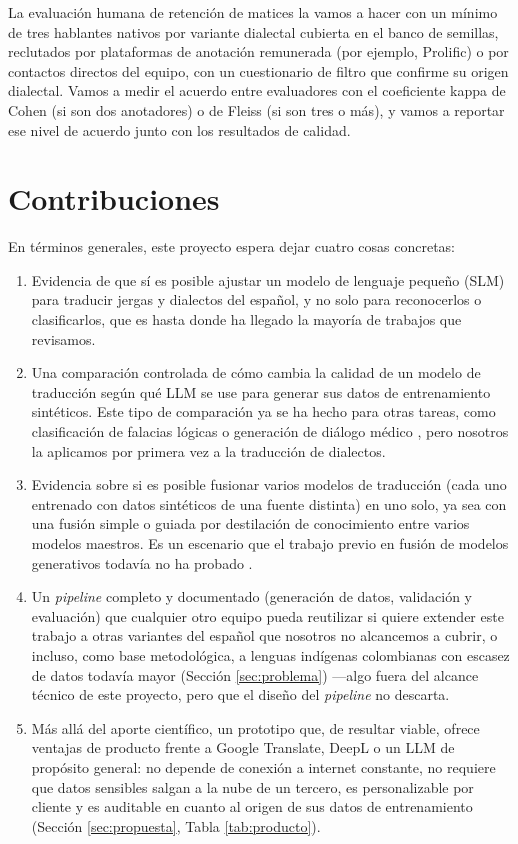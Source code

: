 \documentclass[11pt,a4paper]{article}
\begin{document}
La evaluación humana de retención de matices la vamos a hacer con un mínimo de tres hablantes nativos por variante dialectal cubierta en el banco de semillas, reclutados por plataformas de anotación remunerada (por ejemplo, Prolific) o por contactos directos del equipo, con un cuestionario de filtro que confirme su origen dialectal. Vamos a medir el acuerdo entre evaluadores con el coeficiente kappa de Cohen (si son dos anotadores) o de Fleiss (si son tres o más), y vamos a reportar ese nivel de acuerdo junto con los resultados de calidad.



\section{Contribuciones}
\label{sec:contribuciones}

En términos generales, este proyecto espera dejar cuatro cosas concretas:

\begin{enumerate}
    \item Evidencia de que sí es posible ajustar un modelo de lenguaje pequeño (SLM) para traducir jergas y dialectos del español, y no solo para reconocerlos o clasificarlos, que es hasta donde ha llegado la mayoría de trabajos que revisamos.
    \item Una comparación controlada de cómo cambia la calidad de un modelo de traducción según qué LLM se use para generar sus datos de entrenamiento sintéticos. Este tipo de comparación ya se ha hecho para otras tareas, como clasificación de falacias lógicas o generación de diálogo médico \cite{poliakov2025missynth, allam2025arabic}, pero nosotros la aplicamos por primera vez a la traducción de dialectos.
    \item Evidencia sobre si es posible fusionar varios modelos de traducción (cada uno entrenado con datos sintéticos de una fuente distinta) en uno solo, ya sea con una fusión simple o guiada por destilación de conocimiento entre varios modelos maestros. Es un escenario que el trabajo previo en fusión de modelos generativos todavía no ha probado \cite{dalili2025multiteacher}.
    \item Un \textit{pipeline} completo y documentado (generación de datos, validación y evaluación) que cualquier otro equipo pueda reutilizar si quiere extender este trabajo a otras variantes del español que nosotros no alcancemos a cubrir, o incluso, como base metodológica, a lenguas indígenas colombianas con escasez de datos todavía mayor (Sección \ref{sec:problema}) —algo fuera del alcance técnico de este proyecto, pero que el diseño del \textit{pipeline} no descarta.
    \item Más allá del aporte científico, un prototipo que, de resultar viable, ofrece ventajas de producto frente a Google Translate, DeepL o un LLM de propósito general: no depende de conexión a internet constante, no requiere que datos sensibles salgan a la nube de un tercero, es personalizable por cliente y es auditable en cuanto al origen de sus datos de entrenamiento (Sección \ref{sec:propuesta}, Tabla \ref{tab:producto}).
\end{enumerate}
\end{document}
